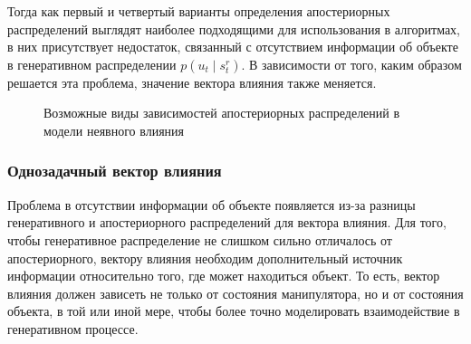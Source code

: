 Тогда как первый и четвертый варианты определения апостериорных распределений выглядят наиболее подходящими для использования в алгоритмах, в них присутствует недостаток, связанный с отсутствием информации об объекте в генеративном распределении $p\left(u_t \mid s^r_t \right)$.
В зависимости от того, каким образом решается эта проблема, значение вектора влияния также меняется.

\begin{figure}[t]%
    \centering
    \scalebox{0.75}{
        
    }
    \scalebox{0.75}{
        
    }
    \scalebox{0.75}{
        
    }
    \scalebox{0.75}{
        
    }
    \caption{Возможные виды зависимостей апостериорных распределений в модели неявного влияния}
    \label{fig:inf_schemes}
\end{figure}

\subsubsection{Однозадачный вектор влияния}
Проблема в отсутствии информации об объекте появляется из-за разницы генеративного и апостериорного распределений для вектора влияния.
Для того, чтобы генеративное распределение не слишком сильно отличалось от апостериорного, вектору влияния необходим дополнительный источник информации относительно того, где может находиться объект.
То есть, вектор влияния должен зависеть не только от состояния манипулятора, но и от состояния объекта, в той или иной мере, чтобы более точно моделировать взаимодействие в генеративном процессе.


